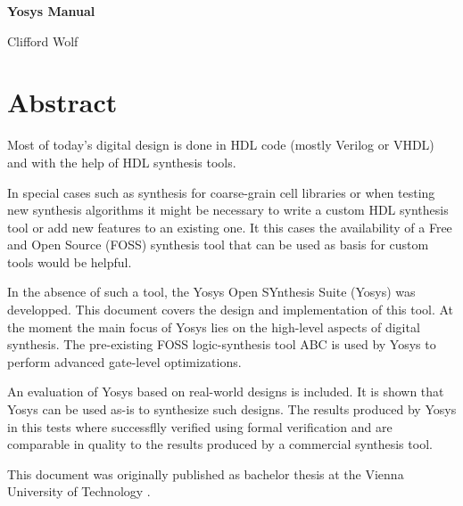 \documentclass[oneside,a4paper]{book}
\begin{document}
\pagestyle{mypagestyle}

\thispagestyle{empty}
\null\vfil

\begin{center}
\bf\Huge Yosys Manual

\bigskip
\large Clifford Wolf
\end{center}

\vfil\null
\eject

\chapter*{Abstract}
Most of today's digital design is done in HDL code (mostly Verilog or VHDL) and
with the help of HDL synthesis tools.

In special cases such as synthesis for coarse-grain cell libraries or when
testing new synthesis algorithms it might be necessary to write a custom HDL
synthesis tool or add new features to an existing one. It this cases the
availability of a Free and Open Source (FOSS) synthesis tool that can be used
as basis for custom tools would be helpful.

In the absence of such a tool, the Yosys Open SYnthesis Suite (Yosys) was
developped. This document covers the design and implementation of this tool.
At the moment the main focus of Yosys lies on the high-level aspects of
digital synthesis. The pre-existing FOSS logic-synthesis tool ABC is used
by Yosys to perform advanced gate-level optimizations.

An evaluation of Yosys based on real-world designs is included. It is shown
that Yosys can be used as-is to synthesize such designs. The results produced
by Yosys in this tests where successflly verified using formal verification
and are comparable in quality to the results produced by a commercial
synthesis tool.

\bigskip

This document was originally published as bachelor thesis at the Vienna
University of Technology \cite{BACC}.
\end{document}
